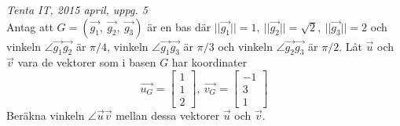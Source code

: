 {\it Tenta IT, 2015 april, uppg. 5}\\
Antag att $G=(\vec{g_1},\ \vec{g_2},\ \vec{g_3})$ är en bas där $||\vec{g_1}||=1,\ ||\vec{g_2}||=\sqrt{2},\ ||\vec{g_3}||=2$ och vinkeln $\angle\vec{g_1}\vec{g_2}$ är $\pi/4$, vinkeln $\angle\vec{g_1}\vec{g_3}$ är $\pi/3$ och vinkeln $\angle\vec{g_2}\vec{g_3}$ är $\pi/2$. Låt $\vec{u}$ och $\vec{v}$ vara de vektorer som i basen $G$ har koordinater
$$\vec{u_G}=\begin{bmatrix}1\\1\\2\end{bmatrix},\ \vec{v_G}=\begin{bmatrix}-1\\3\\1\end{bmatrix}$$
Beräkna vinkeln $\angle\vec{u}\vec{v}$ mellan dessa vektorer $\vec{u}$ och $\vec{v}$.